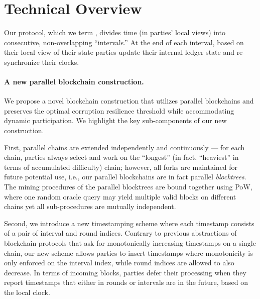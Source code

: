 \section{Technical Overview}
\label{sec:technical-overview}

Our protocol, which we term \pSMR, divides time (in parties' local views) into consecutive, non-overlapping ``intervals.''
%
At the end of each interval, based on their local view of their state parties update their internal ledger state and re-synchronize their clocks.

\paragraph{A new parallel blockchain construction.}
%
We propose a novel blockchain construction that utilizes parallel blockchains and preserves the optimal corruption resilience threshold while accommodating dynamic participation.
%
We highlight the key sub-components of our new construction.

First, parallel chains are extended independently and continuously --- for each chain, parties always select and work on the ``longest'' (in fact, ``heaviest'' in terms of accumulated difficulty) chain; however, all forks are maintained for future potential use, i.e., our parallel blockchains are in fact parallel \emph{blocktrees}.
%
The mining procedures of the parallel blocktrees are bound together using \mforone PoW, where one random oracle query may yield multiple valid blocks on different chains yet all sub-procedures are mutually independent.

Second, we introduce a new timestamping scheme where each timestamp consists of a pair of interval and round indices.
%
Contrary to previous abstractions of blockchain protocols that ask for monotonically increasing timestamps on a single chain, our new scheme allows parties to insert timestamps where monotonicity is only enforced on the interval index, while round indices are allowed to also decrease.
%
In terms of incoming blocks, parties defer their processing when they report timestamps that either in rounds or intervals are in the future, based on the local clock.

